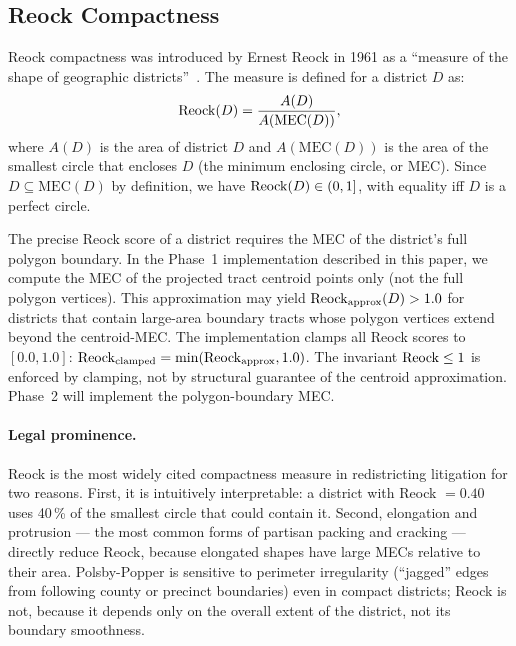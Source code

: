 \subsection{Reock Compactness}
\label{subsec:reock}

Reock compactness was introduced by Ernest Reock in 1961 as a
``measure of the shape of geographic districts''~\citep{reock1961}.
The measure is defined for a district $D$ as:
\begin{equation}
  \mathrm{Reock}{}(D) = \frac{A(D)}{A(\mathrm{MEC}(D))},
  \label{eq:reock}
\end{equation}
where $A(D)$ is the area of district $D$ and $A(\mathrm{MEC}(D))$ is the
area of the smallest circle that encloses $D$ (the minimum enclosing circle,
or MEC).
Since $D \subseteq \mathrm{MEC}(D)$ by definition, we have $\mathrm{Reock}{}(D) \in (0, 1]$,
with equality iff $D$ is a perfect circle.

\begin{remark}
\label{rem:centroid-approx}
The precise Reock score of a district requires the MEC of the district's
full polygon boundary.
In the Phase~1 implementation described in this paper, we compute the MEC of
the projected tract centroid points only (not the full polygon vertices).
This approximation may yield $\mathrm{Reock}{}_{\mathrm{approx}}(D) > 1.0$ for districts
that contain large-area boundary tracts whose polygon vertices extend beyond
the centroid-MEC.
The implementation clamps all Reock scores to $[0.0, 1.0]$: \linebreak
$\mathrm{Reock}{}_{\mathrm{clamped}} = \min(\mathrm{Reock}{}_{\mathrm{approx}}, 1.0)$.
The invariant $\mathrm{Reock}{} \le 1$ is enforced by clamping, not by structural
guarantee of the centroid approximation.
Phase~2 will implement the polygon-boundary MEC.
\end{remark}

\paragraph{Legal prominence.}
Reock is the most widely cited compactness measure in redistricting
litigation for two reasons.
First, it is intuitively interpretable: a district with Reock $= 0.40$ uses
40\,\% of the smallest circle that could contain it.
Second, elongation and protrusion --- the most common forms of partisan
packing and cracking --- directly reduce Reock, because elongated shapes
have large MECs relative to their area.
Polsby-Popper is sensitive to perimeter irregularity (``jagged'' edges from
following county or precinct boundaries) even in compact districts; Reock is
not, because it depends only on the overall extent of the district, not its
boundary smoothness.

